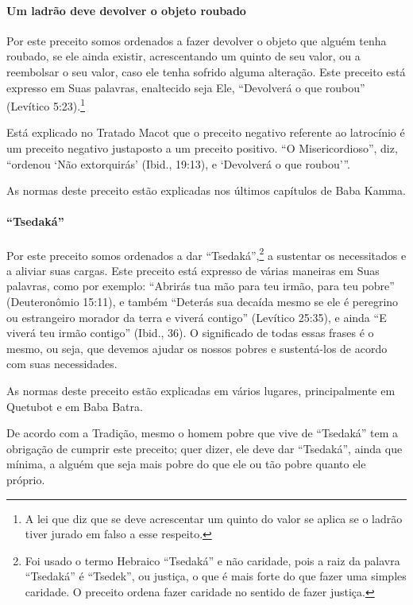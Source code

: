 \paragraph{Um ladrão deve devolver o objeto roubado}

Por este preceito somos ordenados a fazer devolver o objeto que alguém
tenha roubado, se ele ainda existir, acrescentando um quinto de seu
valor, ou a reembolsar o seu valor, caso ele tenha sofrido alguma
alteração. Este preceito está expresso em Suas palavras, enaltecido seja Ele,
``Devolverá o que roubou'' (Levítico 5:23).\footnote{A lei que diz que se deve acrescentar um quinto do valor se aplica se
  o ladrão tiver jurado em falso a esse respeito.}

Está explicado no Tratado Macot que o preceito negativo referente
ao latrocínio é um preceito negativo justaposto a um preceito positivo.
``O Misericordioso'', diz, ``ordenou `Não extorquirás' (Ibid., 19:13), e
`Devolverá o que roubou'''.

As normas deste preceito estão explicadas nos últimos capítulos de Baba Kamma.

\paragraph{``Tsedaká''}

Por este preceito somos ordenados a dar ``Tsedaká'',\footnote{Foi usado o termo Hebraico ``Tsedaká'' e não caridade, pois a raiz da
  palavra ``Tsedaká'' é ``Tsedek'', ou justiça, o que é mais forte do
  que fazer uma simples caridade. O preceito ordena fazer caridade no
  sentido de fazer justiça.} a sustentar
os necessitados e a aliviar suas cargas. Este preceito está expresso de
várias maneiras em Suas palavras, como por exemplo: ``Abrirás tua mão para teu
irmão, para teu pobre'' (Deuteronômio 15:11), e também ``Deterás sua decaída
mesmo se ele é peregrino ou estrangeiro morador da terra e viverá
contigo'' (Levítico 25:35), e ainda ``E viverá teu irmão contigo''
(Ibid., 36). O significado de todas essas frases é o mesmo, ou seja, que
devemos ajudar os nossos pobres e sustentá-los de acordo com suas
necessidades.

As normas deste preceito estão explicadas em vários lugares,
principalmente em Quetubot e em Baba Batra.

De acordo com a Tradição, mesmo o homem pobre que vive de ``Tsedaká''
tem a obrigação de cumprir este preceito; quer dizer, ele deve dar
``Tsedaká'', ainda que mínima, a alguém que seja mais pobre do que ele
ou tão pobre quanto ele próprio.

